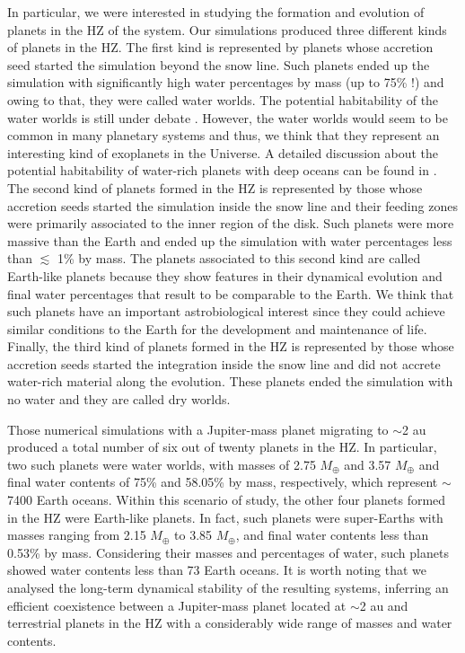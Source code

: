 \documentclass{aa}
\begin{document}
In particular, we were interested in studying the formation and evolution of planets in the HZ of the system. Our simulations produced
three different kinds of planets in the HZ. The first kind is represented by planets whose accretion seed
started the simulation beyond the snow line. Such planets ended up the simulation with significantly high water percentages
by mass (up to 75\% !) and owing to that, they were called water worlds.
The potential habitability of the water worlds is still under debate \citep{Abbot2012, Alibert2014, Kitzmann2015}. However, the water worlds would seem to be common in many planetary systems \citep{deElia2013, Ronco2014} and thus, we think that
they represent an interesting kind of exoplanets in the Universe. A detailed discussion about the potential habitability of water-rich planets with deep oceans can be found in \citet{Noack2016}.
The second kind of planets formed in the HZ is represented by those whose accretion seeds started the simulation
inside the snow line and their feeding zones were primarily associated to the inner region of the disk. Such planets were more
massive than the Earth and ended up the simulation with water percentages less than $\lesssim$ 1\% by mass. The planets
associated to this second kind are called Earth-like planets because they show features in their dynamical evolution
and final water percentages that result to be comparable to the Earth.
We think that such planets have an important astrobiological interest since they could achieve similar conditions to the Earth for the development and maintenance of life. Finally, the third kind of planets formed in the HZ is represented by those whose accretion seeds started the integration inside the snow line and did not accrete water-rich material along the evolution. These planets ended the simulation with no water and they are called dry worlds.

Those numerical simulations with a Jupiter-mass planet migrating to $\sim$2 au produced a total number of six out of twenty
planets in the HZ. In particular, two such planets were water worlds, with masses of 2.75 $M_{\oplus}$ and 3.57 $M_{\oplus}$ and final water contents of 75\% and 58.05\% by mass, respectively, which represent $\sim$7400 Earth oceans. Within this scenario of study, the other four planets formed in the HZ were Earth-like planets. In fact, such planets were super-Earths with masses ranging from 2.15 $M_{\oplus}$ to 3.85
$M_{\oplus}$, and final water contents less than 0.53\% by mass. Considering their masses and percentages of water, such planets showed
water contents less than 73 Earth oceans. It is worth noting that we analysed the long-term dynamical stability of the resulting systems,
inferring an efficient coexistence between a Jupiter-mass planet located at $\sim$2 au and terrestrial planets in the HZ with a considerably wide range of masses and water contents.
\end{document}
